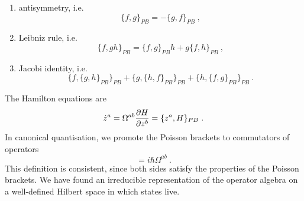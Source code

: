     \begin{enumerate}
        \item antisymmetry, i.e.
            \begin{equation*}
                \{f, g\}_{PB} = - \{g, f\}_{PB} ~,
            \end{equation*}
        \item Leibniz rule, i.e. 
            \begin{equation*}
                \{f, g h\}_{PB} = \{f, g\}_{PB} h + g \{f, h\}_{PB}~,
            \end{equation*}
        \item Jacobi identity, i.e. 
            \begin{equation*}
                \{f, \{g, h\}_{PB} \}_{PB} + \{g, \{h, f\}_{PB} \}_{PB} + \{h, \{f, g\}_{PB} \}_{PB} ~.
            \end{equation*}
    \end{enumerate}
    The Hamilton equations are 
    \begin{equation*}
        \dot z^a = \Omega^{ab} \frac{\partial H}{\partial z^b} = \{z^a, H\}_{PB} ~.
    \end{equation*}
    In canonical quantisation, we promote the Poisson brackets to commutators of operators
    \begin{equation*}
        [\hat z^a, \hat z^b] = i \hbar \Omega^{ab} ~.
    \end{equation*}
    This definition is consistent, since both sides satisfy the properties of the Poisson brackets. We have found an irreducible representation of the operator algebra on a well-defined Hilbert space in which states live.

